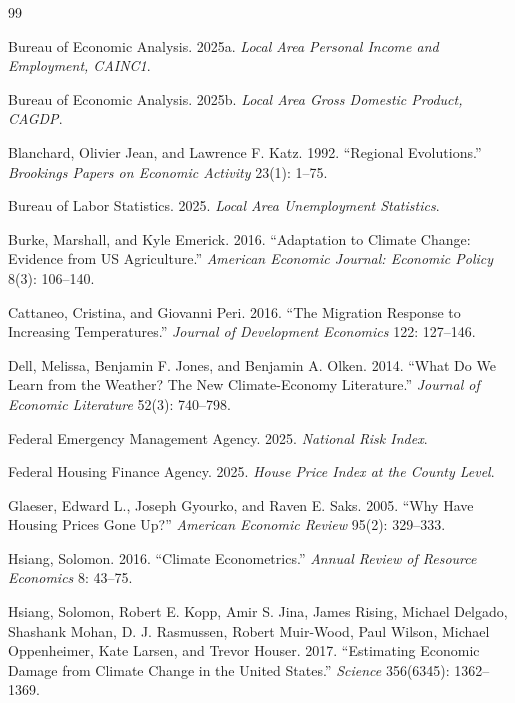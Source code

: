 \documentclass[12pt]{article}
\begin{document}
\begin{thebibliography}{99}

Bureau of Economic Analysis. 2025a. \emph{Local Area Personal Income and Employment, CAINC1}.

Bureau of Economic Analysis. 2025b. \emph{Local Area Gross Domestic Product, CAGDP}.

Blanchard, Olivier Jean, and Lawrence F. Katz. 1992. ``Regional Evolutions.'' \emph{Brookings Papers on Economic Activity} 23(1): 1--75.

Bureau of Labor Statistics. 2025. \emph{Local Area Unemployment Statistics}.

Burke, Marshall, and Kyle Emerick. 2016. ``Adaptation to Climate Change: Evidence from US Agriculture.'' \emph{American Economic Journal: Economic Policy} 8(3): 106--140.

Cattaneo, Cristina, and Giovanni Peri. 2016. ``The Migration Response to Increasing Temperatures.'' \emph{Journal of Development Economics} 122: 127--146.

Dell, Melissa, Benjamin F. Jones, and Benjamin A. Olken. 2014. ``What Do We Learn from the Weather? The New Climate-Economy Literature.'' \emph{Journal of Economic Literature} 52(3): 740--798.

Federal Emergency Management Agency. 2025. \emph{National Risk Index}.

Federal Housing Finance Agency. 2025. \emph{House Price Index at the County Level}.

Glaeser, Edward L., Joseph Gyourko, and Raven E. Saks. 2005. ``Why Have Housing Prices Gone Up?'' \emph{American Economic Review} 95(2): 329--333.

Hsiang, Solomon. 2016. ``Climate Econometrics.'' \emph{Annual Review of Resource Economics} 8: 43--75.

Hsiang, Solomon, Robert E. Kopp, Amir S. Jina, James Rising, Michael Delgado, Shashank Mohan, D. J. Rasmussen, Robert Muir-Wood, Paul Wilson, Michael Oppenheimer, Kate Larsen, and Trevor Houser. 2017. ``Estimating Economic Damage from Climate Change in the United States.'' \emph{Science} 356(6345): 1362--1369.


\end{thebibliography}
\end{document}
